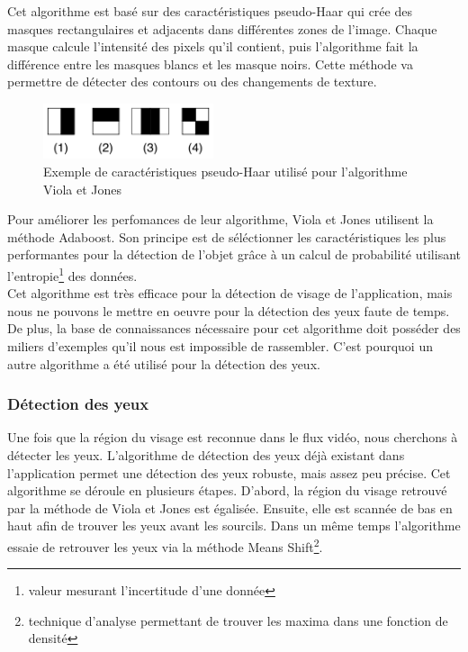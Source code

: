 Cet algorithme est basé sur des caractéristiques pseudo-Haar qui crée des masques rectangulaires et adjacents
dans différentes zones de l'image. Chaque masque calcule l'intensité des pixels qu'il contient, puis l'algorithme fait
la différence entre les masques blancs et les masque noirs. Cette méthode va permettre de détecter des contours ou des changements de 
texture.\\

\begin{figure}[H]
\center
\includegraphics[width=5cm]{image/pseudo_haar.png}
\caption{Exemple de caractéristiques pseudo-Haar utilisé pour l'algorithme Viola et Jones}
\end{figure}

Pour améliorer les perfomances de leur algorithme, Viola et Jones utilisent la méthode Adaboost. Son
principe est de séléctionner les caractéristiques les plus performantes pour la détection de l'objet grâce à
un calcul de probabilité utilisant l'entropie\footnote{valeur mesurant l'incertitude d'une donnée} des données.\\

Cet algorithme est très efficace pour la détection de visage de l'application, mais nous ne pouvons le mettre
en oeuvre pour la détection des yeux faute de temps. De plus, la base de connaissances nécessaire pour cet 
algorithme doit posséder des miliers d'exemples qu'il nous est impossible de rassembler. C'est pourquoi
un autre algorithme a été utilisé pour la détection des yeux.

\subsubsection{Détection des yeux}
Une fois que la région du visage est reconnue dans le flux vidéo, nous cherchons à détecter les yeux. 
L'algorithme de détection des yeux déjà existant dans l'application permet une détection des yeux 
robuste, mais assez peu précise. Cet algorithme se déroule en plusieurs étapes. D'abord, la région du visage 
retrouvé par la méthode de Viola et Jones est égalisée. Ensuite, elle est scannée de bas en haut afin de
trouver les yeux avant les sourcils. Dans un même temps l'algorithme essaie de retrouver les yeux via la
méthode Means Shift\footnote{technique d'analyse permettant de trouver les maxima dans une fonction de densité}.\\



